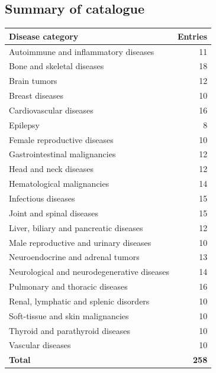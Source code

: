 \subsection{Summary of catalogue}
\begin{center}
\begin{tabular}{@{}p{}r@{}}
\toprule
\textbf{Disease category} & \textbf{Entries} \\
\midrule
Autoimmune and inflammatory diseases & 11 \\
Bone and skeletal diseases & 18 \\
Brain tumors & 12 \\
Breast diseases & 10 \\
Cardiovascular diseases & 16 \\
Epilepsy & 8 \\
Female reproductive diseases & 10 \\
Gastrointestinal malignancies & 12 \\
Head and neck diseases & 12 \\
Hematological malignancies & 14 \\
Infectious diseases & 15 \\
Joint and spinal diseases & 15 \\
Liver, biliary and pancreatic diseases & 12 \\
Male reproductive and urinary diseases & 10 \\
Neuroendocrine and adrenal tumors & 13 \\
Neurological and neurodegenerative diseases & 14 \\
Pulmonary and thoracic diseases & 16 \\
Renal, lymphatic and splenic disorders & 10 \\
Soft-tissue and skin malignancies & 10 \\
Thyroid and parathyroid diseases & 10 \\
Vascular diseases & 10 \\
\midrule
\textbf{Total} & \textbf{258} \\
\bottomrule
\end{tabular}
\end{center}

